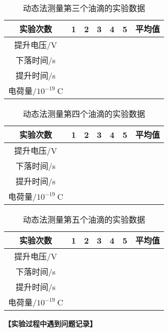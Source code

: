 \documentclass[11pt,a4paper]{ctexart}
\begin{document}
\begin{table}[h!]
\centering
\caption{动态法测量第三个油滴的实验数据}
\label{my-label}
\begin{tabular}{|c|p{12mm}|p{12mm}|p{12mm}|p{12mm}|p{12mm}|p{12mm}|}
\hline
实验次数 & 1 & 2 & 3 & 4 & 5 & 平均值 \\ \hline
提升电压/V &  &  &  &  &  &  \\ \hline
下落时间/s &  &  &  &  &  &  \\ \hline
提升时间/s &  &  &  &  &  &  \\ \hline
电荷量/$10^{-19}\mathrm{\ C}$ &  &  &  &  &  &  \\ \hline
\end{tabular}
\end{table}
\newpage
\begin{table}[h!]
\centering
\caption{动态法测量第四个油滴的实验数据}
\label{my-label}
\begin{tabular}{|c|p{12mm}|p{12mm}|p{12mm}|p{12mm}|p{12mm}|p{12mm}|}
\hline
实验次数 & 1 & 2 & 3 & 4 & 5 & 平均值 \\ \hline
提升电压/V &  &  &  &  &  &  \\ \hline
下落时间/s &  &  &  &  &  &  \\ \hline
提升时间/s &  &  &  &  &  &  \\ \hline
电荷量/$10^{-19}\mathrm{\ C}$ &  &  &  &  &  &  \\ \hline
\end{tabular}
\end{table}
\begin{table}[h!]
\centering
\caption{动态法测量第五个油滴的实验数据}
\label{my-label}
\begin{tabular}{|c|p{12mm}|p{12mm}|p{12mm}|p{12mm}|p{12mm}|p{12mm}|}
\hline
实验次数 & 1 & 2 & 3 & 4 & 5 & 平均值 \\ \hline
提升电压/V &  &  &  &  &  &  \\ \hline
下落时间/s &  &  &  &  &  &  \\ \hline
提升时间/s &  &  &  &  &  &  \\ \hline
电荷量/$10^{-19}\mathrm{\ C}$ &  &  &  &  &  &  \\ \hline
\end{tabular}
\end{table}
\textbf{【实验过程中遇到问题记录】}

%
\end{document}
